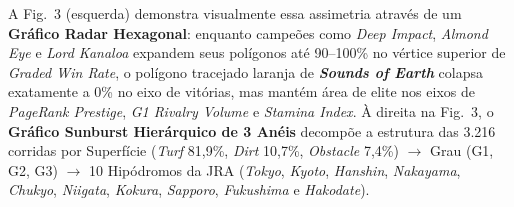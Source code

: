 \documentclass[conference]{IEEEtran}
\begin{document}
\begin{table}[htbp]
\caption{Anomalias Topológicas Descobertas pelo PageRank Esportivo em $G_c$: ``Diamantes Injustiçados'' (0 Vitórias Graded) e ``Colecionadores de Prata'' (0 Vitórias G1)}
\begin{center}
\renewcommand{\arraystretch}{1.15}
\setlength{\tabcolsep}{3.2pt}
\label{tab:pagerank_anomalies_aeds2}
\end{center}
\end{table}

A Fig.~3 (esquerda) demonstra visualmente essa assimetria através de um \textbf{Gráfico Radar Hexagonal}: enquanto campeões como \textit{Deep Impact}, \textit{Almond Eye} e \textit{Lord Kanaloa} expandem seus polígonos até 90--100\%
no vértice superior de \textit{Graded Win Rate}, o polígono tracejado laranja de \textbf{\textit{Sounds of Earth}} colapsa exatamente a 0\%
no eixo de vitórias, mas mantém área de elite nos eixos de \textit{PageRank Prestige}, \textit{G1 Rivalry Volume} e \textit{Stamina Index}. À direita na Fig.~3, o \textbf{Gráfico Sunburst Hierárquico de 3 Anéis} decompõe a estrutura das 3.216 corridas por Superfície (\textit{Turf} 81,9\%,
\textit{Dirt} 10,7\%,
\textit{Obstacle} 7,4\%)
$\to$ Grau (G1, G2, G3) $\to$ 10 Hipódromos da JRA (\textit{Tokyo}, \textit{Kyoto}, \textit{Hanshin}, \textit{Nakayama}, \textit{Chukyo}, \textit{Niigata}, \textit{Kokura}, \textit{Sapporo}, \textit{Fukushima} e \textit{Hakodate}).
\end{document}
